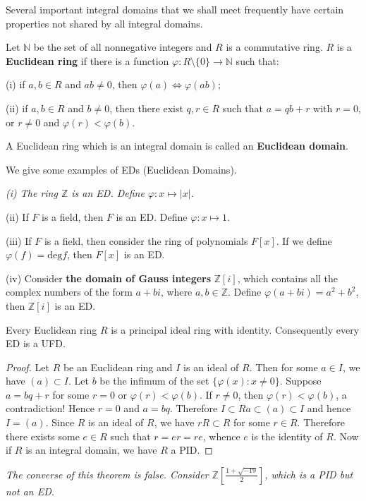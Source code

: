 Several important integral domains that we shall meet frequently have certain properties not shared by all integral domains.
\begin{definition}
Let $\mathbb{N}$ be the set of all nonnegative integers and $R$ is a commutative ring. $R$ is a \textbf{Euclidean ring} if there is a function $\varphi:R\setminus\{0\}\to\mathbb{N}$ such that: \par
(i) if $a,b\in R$ and $ab\ne 0$, then $\varphi(a)\Leftrightarrow\varphi(ab)$;\par
(ii) if $a,b\in R$ and $b\ne 0$, then there exist $q,r\in R$ such that $a=qb+r$ with $r=0$, or $r\ne 0$ and $\varphi(r)<\varphi(b)$.\par
A Euclidean ring which is an integral domain is called an \textbf{Euclidean domain}.
\end{definition}
We give some examples of EDs (Euclidean Domains).
\begin{example}\em
(i) The ring $\mathbb{Z}$ is an ED. Define $\varphi:x\mapsto|x|$.\par
(ii) If $F$ is a field, then $F$ is an ED. Define $\varphi:x\mapsto 1$.\par
(iii) If $F$ is a field, then consider the ring of polynomials $F[x]$. If we define $\varphi(f)=\mathrm{deg}f$, then $F[x]$ is an ED.\par
(iv) Consider \textbf{the domain of Gauss integers} $\mathbb{Z}[i]$, which contains all the complex numbers of the form $a+bi$, where $a,b\in\mathbb{Z}$. Define $\varphi(a+bi)=a^2+b^2$, then $\mathbb{Z}[i]$ is an ED.
\end{example}
\begin{theorem}
Every Euclidean ring $R$ is a principal ideal ring with identity. Consequently every ED is a UFD.
\end{theorem}
\begin{proof}
Let $R$ be an Euclidean ring and $I$ is an ideal of $R$. Then for some $a\in I$, we have $(a)\subset I$. Let $b$ be the infimum of the set $\{\varphi(x):x\ne 0\}$. Suppose $a=bq+r$ for some $r=0$ or $\varphi(r)<\varphi(b)$. If $r\ne 0$, then $\varphi(r)<\varphi(b)$, a contradiction! Hence $r=0$ and $a=bq$. Therefore $I\subset Ra\subset(a)\subset I$ and hence $I=(a)$. Since $R$ is an ideal of $R$, we have $rR\subset R$ for some $r\in R$. Therefore there exists some $e\in R$ such that $r=er=re$, whence $e$ is the identity of $R$. Now if $R$ is an integral domain, we have $R$ a PID.
\end{proof}
\begin{note}\em
The converse of this theorem is false. Consider $\mathbb{Z}\left[\frac{1+\sqrt{-19}}{2}\right]$, which is a PID but not an ED.
\end{note}
